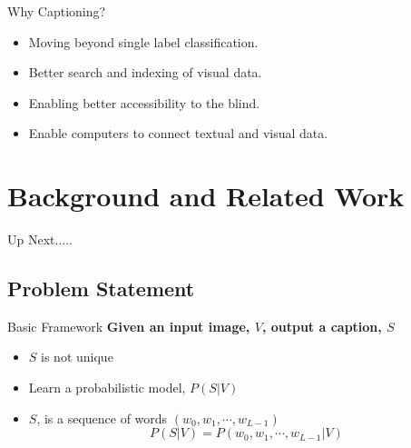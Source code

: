 \documentclass{beamer}
\begin{document}
\begin{frame}{Why Captioning?}
\begin{itemize}
\item Moving beyond single label classification.
\item Better search and indexing of visual data.
\item Enabling better accessibility to the blind.
\item Enable computers to connect textual and visual data. 
\end{itemize}
\end{frame}

\section{Background and Related Work}
\begin{frame}{Up Next.....}
\tableofcontents[currentsection] 
\end{frame}
\subsection{Problem Statement}
\begin{frame}{Basic Framework}
\textbf{Given an input image, $V$, output a caption, $S$}
\begin{itemize}
\item $S$ is not unique
\item Learn a probabilistic model, $P(S|V)$
\item $S$, is a sequence of words $(w_0, w_1,\cdots, w_{L-1})$
\begin{equation}
\label{eq:langB1} P(S|V) = P(w_0, w_1, \cdots, w_{L-1}|V)
\end{equation}
\end{itemize} 
\end{frame}
\end{document}
